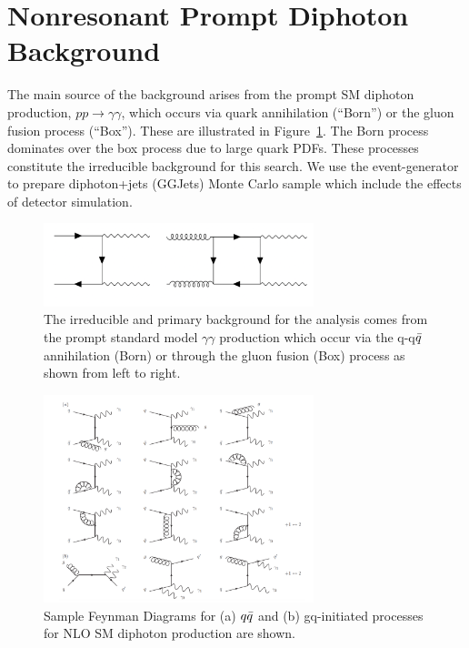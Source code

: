 \section{Nonresonant Prompt Diphoton Background}\label{sec:bkg_real}
The main source of the background arises from the prompt SM diphoton production, $pp\longrightarrow \gamma\gamma$, which occurs via quark annihilation (``Born'') or the gluon fusion process (``Box''). These are illustrated in Figure~\ref{fig:LOFeynmanBackgroundDiphoton}. The Born process dominates over the box process due to large quark PDFs. These processes constitute the irreducible background for this search. We use the \SHERPA event-generator to prepare diphoton+jets (GGJets) Monte Carlo sample which include the effects of detector simulation. 

\begin{figure}[!htbp]
\caption{The irreducible and primary background for the analysis comes from the prompt standard model $\gamma\gamma$ production which occur via the q-q$\Bar{q}$ annihilation (Born) or through the gluon fusion (Box)  process as shown from left to right.}
\begin{center}
\includegraphics[angle=0,width=0.7\textwidth]{fig/PromptDiphotonBackground.png}
\end{center}
\label{fig:LOFeynmanBackgroundDiphoton}
\end{figure}


\begin{figure}[htbp!]
\caption{Sample Feynman Diagrams for (a) $q\Bar{q}$ and (b) gq-initiated processes for NLO SM diphoton production are shown. \cite{DErrico:2011cgc}}
\begin{center}
\includegraphics[angle=0,width=0.7\textwidth]{fig/FeynmanDiagramsNLO.png}
\end{center}
\label{fig:NLOSMBackground}
\end{figure}

